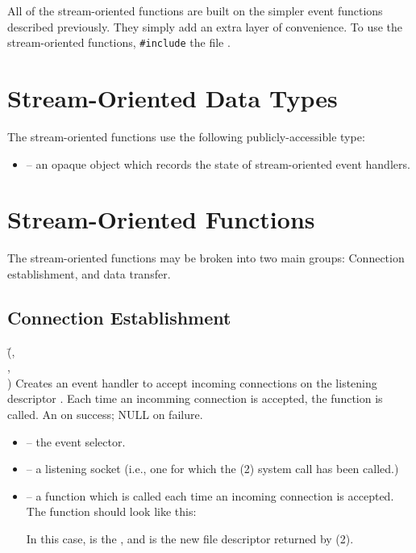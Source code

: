 \documentclass{article}
\newcommand{\Es}{\type{EventSelector}}
\newcommand{\Eh}{\type{EventHandler}}
\begin{document}
All of the stream-oriented functions are built on the simpler event
functions described previously.  They simply add an extra layer of
convenience.  To use the stream-oriented functions,
\texttt{\#include} the file .

\section{Stream-Oriented Data Types}

The stream-oriented functions use the following publicly-accessible type:
\begin{itemize}
\item {} -- an opaque object which records the state
  of stream-oriented event handlers.
\end{itemize}

\section{Stream-Oriented Functions}
\label{sec:basic-stream-oriented-functions}

The stream-oriented functions may be broken into two main groups:
Connection establishment, and data transfer.

\subsection{Connection Establishment}

{(\=,\\
  \> ,\\
  \> )}
{Creates an event handler to accept incoming connections on the listening
  descriptor .  Each time an incomming connection is accepted,
  the function  is called.}
{An \Eh{} on success; NULL on failure.}
\begin{itemize}
\item {} -- the event selector.
\item {} -- a listening socket (i.e., one for which the
  (2) system call has been called.)
\item {} -- a function which is called each time an incoming
  connection is accepted.  The function  should look like this:

   

  In this case,  is the \Es{}, and  is the new file
  descriptor returned by (2).
\end{itemize}
\end{document}
